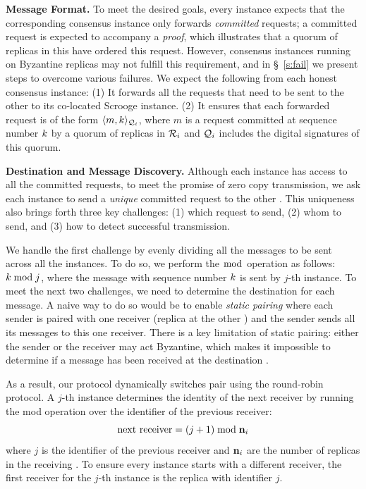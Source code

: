 {\bf Message Format.}
To meet the desired goals, every \Scrooge{} instance expects that the 
corresponding consensus instance only forwards {\em committed} requests;
a committed request is expected to accompany a {\em proof}, which illustrates that a quorum of 
replicas in this \RSM{} have ordered this request.
However, consensus instances running on Byzantine replicas may not fulfill this requirement, 
and in \S~\ref{s:fail} we present steps to overcome various failures.
We expect the following from each honest consensus instance:
(1) It forwards all the requests that need to be sent to the other \RSM{} to its co-located Scrooge instance. 
(2) It ensures that each forwarded request is of the form $\langle m, k\rangle_{\mathcal{Q}_{i}}$, 
where $m$ is a request committed at sequence number $k$ by a quorum of replicas in \RSM{} $\mathcal{R}_{i}$ 
and $\mathcal{Q}_{i}$ includes the digital signatures of this quorum.


{\bf Destination and Message Discovery.}
Although each \Scrooge{} instance has access to all the committed requests, 
to meet the promise of zero copy transmission,
we ask each instance to send a {\em unique} committed request to the other \RSM{}.
This uniqueness also brings forth three key challenges:
(1) which request to send, 
(2) whom to send, and
(3) how to detect successful transmission.

We handle the first challenge by evenly dividing all the messages to be sent across all the 
\Scrooge{} instances.
To do so, we perform the $\bmod$ operation as follows: 
$k \bmod j$, where the message with sequence number $k$ is sent by $j$-th \Scrooge{} instance.
%
To meet the next two challenges, we need to determine the destination for each message. 
A naive way to do so would be to enable {\em static pairing} where each sender is paired 
with one receiver (replica at the other \RSM{}) and the sender sends all its messages to this one receiver.
There is a key limitation of static pairing: 
either the sender or the receiver may act Byzantine, which makes it impossible to determine if a message 
has been received at the destination \RSM{}.

As a result, our \Scrooge{} protocol dynamically switches pair using the round-robin protocol.
A $j$-th \Scrooge{} instance determines the identity of the next receiver by running the mod operation 
over the identifier of the previous receiver:
\begin{equation}
 \text{next receiver} =  (j + 1) \bmod \textbf{n}_{i}
\end{equation}
where $j$ is the identifier of the previous receiver and $\textbf{n}_{i}$ are the number of replicas in the receiving \RSM{}.
To ensure every instance starts with a different receiver, the first receiver for the $j$-th 
instance is the replica with identifier $j$.

